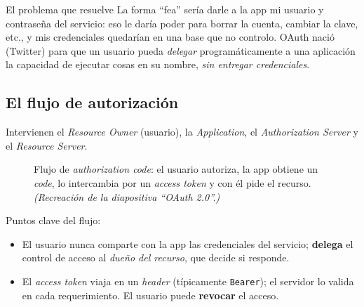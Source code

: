\documentclass[11pt,a4paper]{article}
\begin{document}
\begin{anecbox}{El problema que resuelve}
La forma ``fea'' sería darle a la app mi usuario y contraseña del servicio: eso le daría poder
para borrar la cuenta, cambiar la clave, etc., y mis credenciales quedarían en una base que no
controlo. OAuth nació (Twitter) para que un usuario pueda \emph{delegar} programáticamente a
una aplicación la capacidad de ejecutar cosas en su nombre, \emph{sin entregar credenciales}.
\end{anecbox}

\subsection{El flujo de autorización}
Intervienen el \emph{Resource Owner} (usuario), la \emph{Application}, el
\emph{Authorization Server} y el \emph{Resource Server}.

\begin{figure}[h]
\centering
{}
\caption{Flujo de \emph{authorization code}: el usuario autoriza, la app obtiene un
\emph{code}, lo intercambia por un \emph{access token} y con él pide el recurso.
\textit{(Recreación de la diapositiva ``OAuth 2.0''.)}}
\end{figure}

\noindent Puntos clave del flujo:
\begin{itemize}[leftmargin=1.4em,itemsep=1pt]
  \item El usuario nunca comparte con la app las credenciales del servicio; \textbf{delega} el
        control de acceso al \emph{dueño del recurso}, que decide si responde.
  \item El \emph{access token} viaja en un \emph{header} (típicamente \texttt{Bearer}); el
        servidor lo valida en cada requerimiento. El usuario puede \textbf{revocar} el acceso.
\end{itemize}
\end{document}
